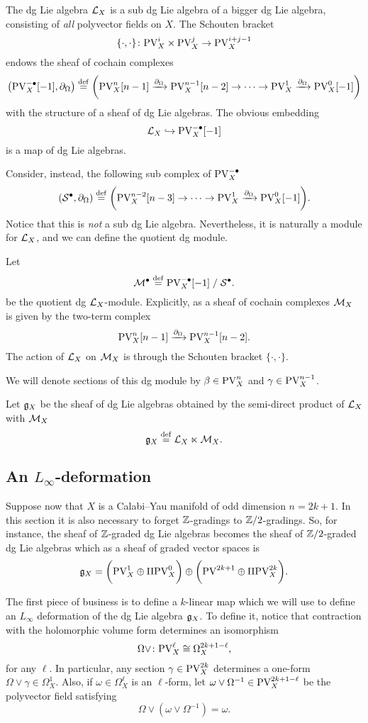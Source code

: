 \documentclass[11pt]{amsart}
\numberwithin{equation}{section}
\def\PV{{\rm PV}}
\def\div{\partial_\Omega}
\begin{document}
The dg Lie algebra $\mathcal L_X$ is a sub dg Lie algebra of a bigger dg Lie algebra, consisting of {\em all} polyvector fields on $X$. 
The Schouten bracket 
\[
\{\cdot, \cdot\} \colon \PV^{i}_X \times \PV^{j}_X \to \PV^{i+j-1}_X 
\]
endows the sheaf of cochain complexes
\[
\left(\PV^{-\bu}_X [-1] , \div \right) \define \bigg( \PV^n_X [n-1] \xto{\div} \PV^{n-1}_X [n-2] \to \cdots \to \PV^1_X \xto{\div} \PV^0_X[-1] \bigg)
\] 
with the structure of a sheaf of dg Lie algebras.
The obvious embedding 
\[
\cL_X \hookrightarrow \PV^{-\bu}_X [-1]
\] 
is a map of dg Lie algebras. 

Consider, instead, the following sub complex of $\PV^{-\bu}_X$ 
\[
\left(\cS^\bu , \div\right) \define \bigg(\PV^{n-2}_X [n-3] \to \cdots \to \PV^1_X \xto{\div} \PV^0_X[-1] \bigg) .
\]
Notice that this is {\em not} a sub dg Lie algebra. 
Nevertheless, it is naturally a module for $\mathcal L_X$, and we can define the quotient dg module.

\begin{dfn}
Let 
\[
\cM^\bu \define \PV^{-\bu}_X [-1] \; / \; \cS^\bu  .
\]
be the quotient dg $\mathcal L_X$-module.
Explicitly, as a sheaf of cochain complexes $\mathcal M_X$ is given by the two-term complex
\[
\PV^n_X [n-1] \xto{\div} \PV^{n-1}_X [n-2] .
\]
The action of $\mathcal L_X$ on $\mathcal M_X$ is through the Schouten bracket $\{\cdot,\cdot\}$. 
\end{dfn}

We will denote sections of this dg module by $\beta \in \PV^n_X$ and $\gamma \in \PV^{n-1}_X$. 

\begin{dfn}
Let $\mathfrak g_X$ be the sheaf of dg Lie algebras obtained by the semi-direct product of $\mathcal L_X$ with $\mathcal M_X$
\[
\mathfrak g_X \overset{\rm def}{=} \mathcal L_X \ltimes \mathcal M_X .
\]
\end{dfn}

\subsection{An $L_\infty$-deformation}

Suppose now that $X$ is a Calabi--Yau manifold of odd dimension $n=2k+1$. 
In this section it is also necessary to forget $\mathbb Z$-gradings to $\mathbb Z/2$-gradings. 
So, for instance, the sheaf of $\mathbb Z$-graded dg Lie algebras becomes the sheaf of $\mathbb Z/2$-graded dg Lie algebras which as a sheaf of graded vector spaces is
\[
\fg_X = \bigg(\PV^1_X \oplus \Pi \PV^0_X \bigg) \oplus \bigg(\PV^{2k+1} \oplus \Pi \PV^{2k}_X \bigg) .
\]

The first piece of business is to define a $k$-linear map which we will use to define an $L_\infty$ deformation of the dg Lie algebra $\mathfrak g_X$. 
To define it, notice that contraction with the holomorphic volume form determines an isomorphism 
\[
\Omega \vee \colon \PV^{\ell}_X \cong \Omega^{2k +1 - \ell}_X ,
\]
for any $\ell$. 
In particular, any section $\gamma \in \PV^{2k}_X$ determines a one-form $\Omega \vee \gamma \in \Omega^1_X$. 
Also, if $\omega \in \Omega^{\ell}_X$ is an $\ell$-form, let $\omega \vee \Omega^{-1} \in \PV^{2k+1-\ell}_X$ be the polyvector field satisfying
\[
\Omega \vee (\omega \vee \Omega^{-1}) = \omega .
\]
\end{document}
